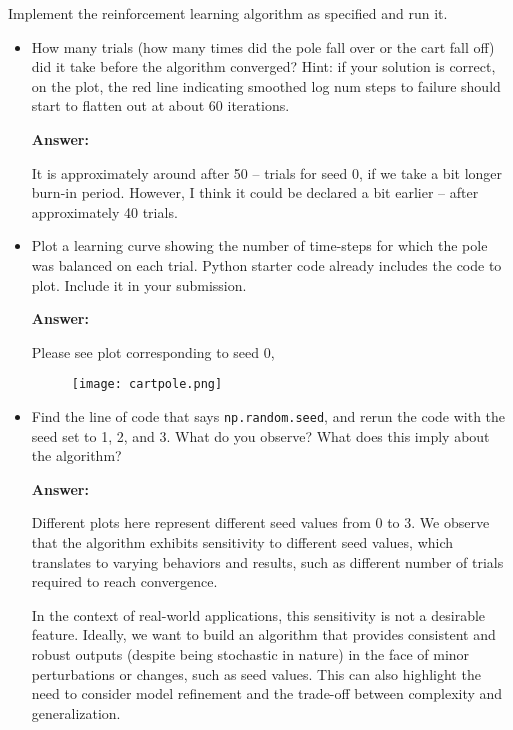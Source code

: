\documentclass{article}
\begin{document}
Implement the reinforcement learning algorithm as specified and run it.
\begin{itemize}
    \item How many trials (how many times did the pole fall over or the cart fall off) did it take before the algorithm converged? Hint: if your solution is correct, on the plot, the red line indicating smoothed log num steps to failure should start to flatten out at about 60 iterations.

    \textbf{Answer:}

    It is approximately around after 50 -- trials for seed 0, if we take a bit longer burn-in period. However, I think it could be declared a bit earlier -- after approximately 40 trials.
    
    \item Plot a learning curve showing the number of time-steps for which the pole was balanced on each trial. Python starter code already includes the code to plot. Include it in your submission.

    \textbf{Answer:}

    Please see plot corresponding to seed 0,

    \begin{figure}[H]
    \centering
    \texttt{[image: cartpole.png]}
    \label{fig:cartpole}
\end{figure}

    
    \item Find the line of code that says \texttt{np.random.seed}, and rerun the code with the seed set to 1, 2, and 3. What do you observe? What does this imply about the algorithm?

    \textbf{Answer:}

    Different plots here represent different seed values from 0 to 3. We observe that the algorithm exhibits sensitivity to different seed values, which translates to varying behaviors and results, such as different number of trials required to reach convergence.

    In the context of real-world applications, this sensitivity is not a desirable feature. Ideally, we want to build an algorithm that provides consistent and robust outputs (despite being stochastic in nature) in the face of minor perturbations or changes, such as seed values. This can also highlight the need to consider model refinement and the trade-off between complexity and generalization.
    
\end{itemize}



\end{document}
